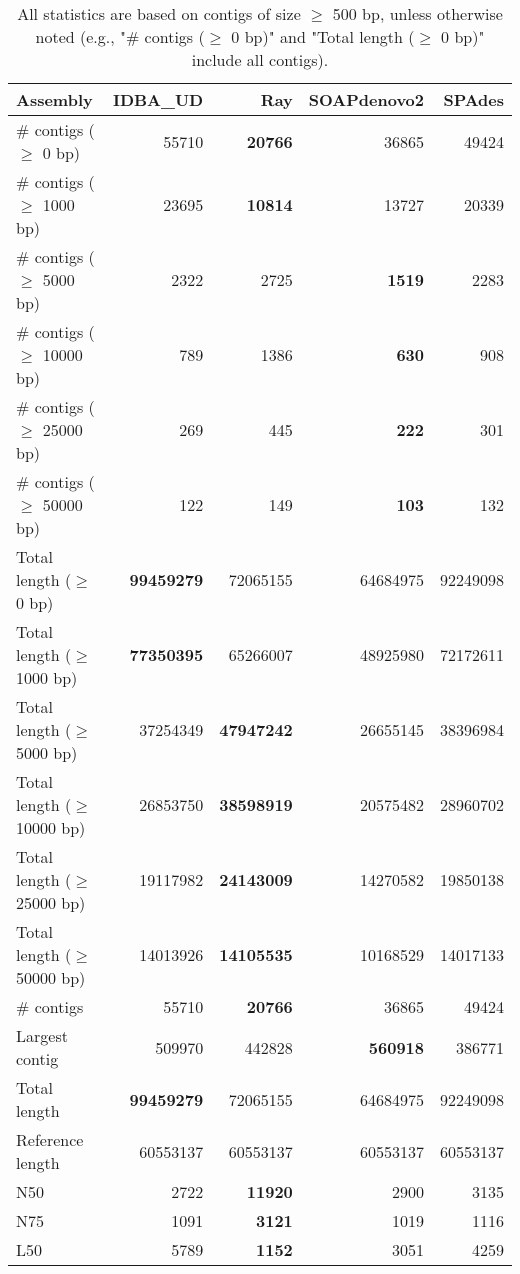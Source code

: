 \documentclass[12pt,a4paper]{article}
\begin{document}
\begin{table}[ht]
\begin{center}
\caption{All statistics are based on contigs of size $\geq$ 500 bp, unless otherwise noted (e.g., "\# contigs ($\geq$ 0 bp)" and "Total length ($\geq$ 0 bp)" include all contigs).}
\begin{tabular}{|l*{4}{|r}|}
\hline
Assembly & IDBA\_UD & Ray & SOAPdenovo2 & SPAdes \\ \hline
\# contigs ($\geq$ 0 bp) & 55710 & {\bf 20766} & 36865 & 49424 \\ \hline
\# contigs ($\geq$ 1000 bp) & 23695 & {\bf 10814} & 13727 & 20339 \\ \hline
\# contigs ($\geq$ 5000 bp) & 2322 & 2725 & {\bf 1519} & 2283 \\ \hline
\# contigs ($\geq$ 10000 bp) & 789 & 1386 & {\bf 630} & 908 \\ \hline
\# contigs ($\geq$ 25000 bp) & 269 & 445 & {\bf 222} & 301 \\ \hline
\# contigs ($\geq$ 50000 bp) & 122 & 149 & {\bf 103} & 132 \\ \hline
Total length ($\geq$ 0 bp) & {\bf 99459279} & 72065155 & 64684975 & 92249098 \\ \hline
Total length ($\geq$ 1000 bp) & {\bf 77350395} & 65266007 & 48925980 & 72172611 \\ \hline
Total length ($\geq$ 5000 bp) & 37254349 & {\bf 47947242} & 26655145 & 38396984 \\ \hline
Total length ($\geq$ 10000 bp) & 26853750 & {\bf 38598919} & 20575482 & 28960702 \\ \hline
Total length ($\geq$ 25000 bp) & 19117982 & {\bf 24143009} & 14270582 & 19850138 \\ \hline
Total length ($\geq$ 50000 bp) & 14013926 & {\bf 14105535} & 10168529 & 14017133 \\ \hline
\# contigs & 55710 & {\bf 20766} & 36865 & 49424 \\ \hline
Largest contig & 509970 & 442828 & {\bf 560918} & 386771 \\ \hline
Total length & {\bf 99459279} & 72065155 & 64684975 & 92249098 \\ \hline
Reference length & 60553137 & 60553137 & 60553137 & 60553137 \\ \hline
N50 & 2722 & {\bf 11920} & 2900 & 3135 \\ \hline
N75 & 1091 & {\bf 3121} & 1019 & 1116 \\ \hline
L50 & 5789 & {\bf 1152} & 3051 & 4259 \\ \hline

\end{tabular}
\end{center}
\end{table}
\end{document}
